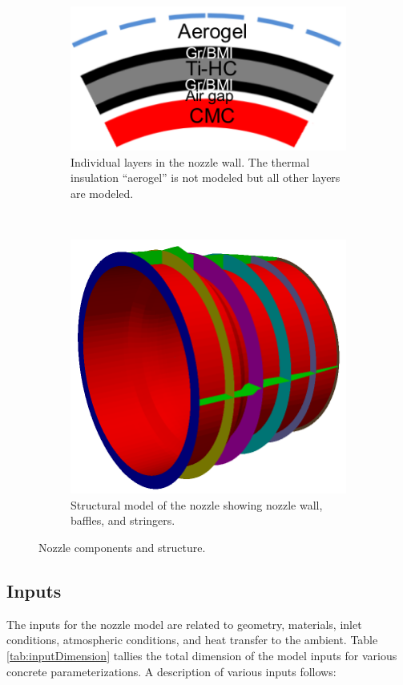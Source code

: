 \documentclass{article}
\begin{document}
\begin{figure}[t!]
    \centering
    \begin{subfigure}[t]{0.5\textwidth}
        \centering
        \includegraphics[width=0.9\linewidth]{figs/layers.png}
        \caption{Individual layers in the nozzle wall. The thermal insulation ``aerogel'' is not modeled but all other layers are modeled.}
    \end{subfigure}%
    ~ 
    \begin{subfigure}[t]{0.5\textwidth}
        \centering
        \includegraphics[width=0.6\linewidth]{figs/structural_model.png}
        \caption{Structural model of the nozzle showing nozzle wall, baffles, and stringers.}
    \end{subfigure}
    \caption{Nozzle components and structure.}
    \label{fig:components}
\end{figure}

\subsection{Inputs}

The inputs for the nozzle model are related to geometry, materials, inlet conditions, atmospheric conditions, and heat transfer to the ambient. Table \ref{tab:inputDimension} tallies the total dimension of the model inputs for various concrete parameterizations. A description of various inputs follows:
\end{document}
